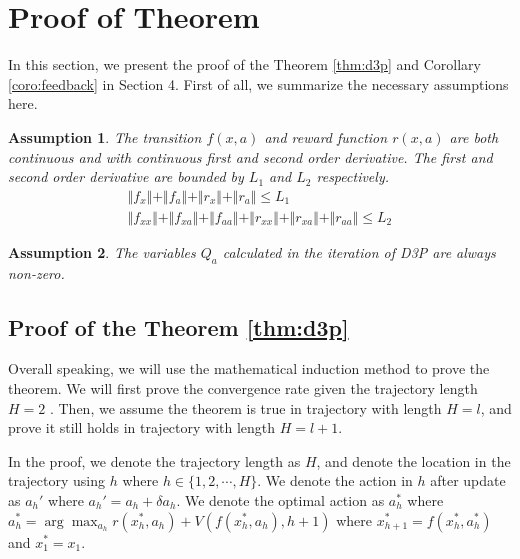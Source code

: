 \documentclass{article} %
\newtheorem{assumption}{Assumption}
\begin{document}
\section{Proof of Theorem}
In this section, we present the proof of the Theorem \ref{thm:d3p} and Corollary \ref{coro:feedback} in Section 4.
First of all, we summarize the necessary assumptions here. 

\begin{assumption}
\label{assumption:Lipschitz}
The transition $f(x,a)$ and reward function $r(x,a)$ are both continuous and with continuous first and second order derivative. The   first and second order derivative are bounded by $L_1$ and $L_2$ respectively.
\begin{align}
    \Vert f_x \Vert + \Vert f_a \Vert + \Vert r_x \Vert + \Vert r_a \Vert \le L_1 \\
    \Vert f_{xx} \Vert + \Vert f_{xa} \Vert + \Vert f_{aa} \Vert +\Vert r_{xx} \Vert + \Vert r_{xa} \Vert + \Vert r_{aa} \Vert \le L_2
\end{align}

\end{assumption}

 

\begin{assumption}
\label{assumption:positive}
The variables $Q_a$ calculated in the iteration of D3P are always non-zero. 
\end{assumption}

 


 



\subsection{Proof of the Theorem \ref{thm:d3p}}
Overall speaking, we will use the mathematical induction method to prove the theorem. We will first prove the convergence rate given the trajectory length $H=2$ . Then, we assume the theorem is true in trajectory with length $H=l$, and prove it still holds in trajectory with length $H=l+1$.

In the proof, we   denote the trajectory length as $H$, and denote the location in the trajectory using $h$ where $h \in  \{1,2,\cdots, H\}$. We denote the action in $h$ after update as $a_h'$ where $a_h' = a_h + \delta a_h$. We denote the optimal action as $a_h^*$ where $a_h^* = \arg\max_{a_h} r(x_h^*, a_h) + V(f(x_h^*, a_h), h+1)$ where $x_{h+1}^* = f(x_{h}^* ,a_{h}^*)$ and $x_1^* = x_1$.
\end{document}
